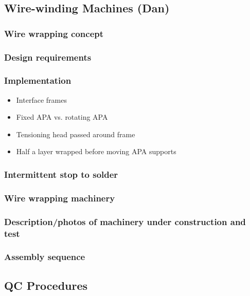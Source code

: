 \subsection{Wire-winding Machines (Dan)}

\subsubsection{Wire wrapping concept}

\subsubsection{Design requirements}

\subsubsection{Implementation}
\begin{itemize}
\item{Interface frames}
\item{Fixed APA vs. rotating APA}
\item{Tensioning head passed around frame}
\item{Half a layer wrapped before moving APA supports}
\end{itemize}

\subsubsection{Intermittent stop to solder}

\subsubsection{Wire wrapping machinery}

\subsubsection{Description/photos of machinery under construction and test}

\subsubsection{Assembly sequence}

\subsection{QC Procedures}


